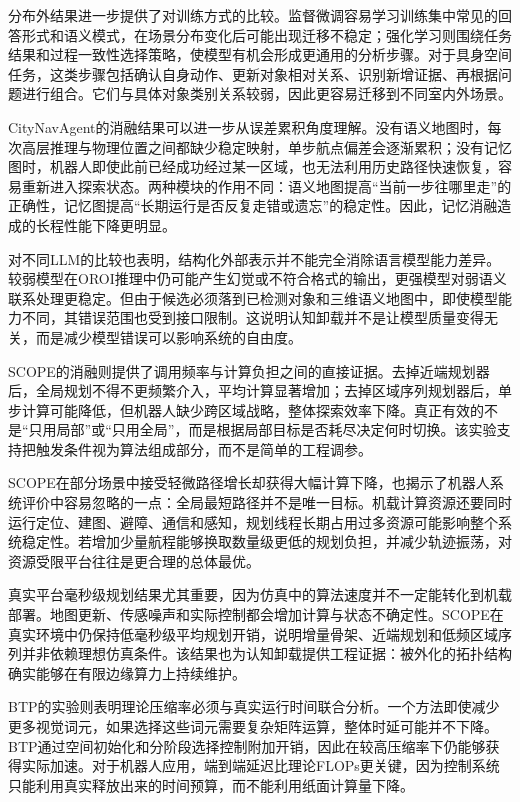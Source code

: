 分布外结果进一步提供了对训练方式的比较。监督微调容易学习训练集中常见的回答形式和语义模式，在场景分布变化后可能出现迁移不稳定；强化学习则围绕任务结果和过程一致性选择策略，使模型有机会形成更通用的分析步骤。对于具身空间任务，这类步骤包括确认自身动作、更新对象相对关系、识别新增证据、再根据问题进行组合。它们与具体对象类别关系较弱，因此更容易迁移到不同室内外场景。

CityNavAgent的消融结果可以进一步从误差累积角度理解。没有语义地图时，每次高层推理与物理位置之间都缺少稳定映射，单步航点偏差会逐渐累积；没有记忆图时，机器人即使此前已经成功经过某一区域，也无法利用历史路径快速恢复，容易重新进入探索状态。两种模块的作用不同：语义地图提高“当前一步往哪里走”的正确性，记忆图提高“长期运行是否反复走错或遗忘”的稳定性。因此，记忆消融造成的长程性能下降更明显。

对不同LLM的比较也表明，结构化外部表示并不能完全消除语言模型能力差异。较弱模型在OROI推理中仍可能产生幻觉或不符合格式的输出，更强模型对弱语义联系处理更稳定。但由于候选必须落到已检测对象和三维语义地图中，即使模型能力不同，其错误范围也受到接口限制。这说明认知卸载并不是让模型质量变得无关，而是减少模型错误可以影响系统的自由度。

SCOPE的消融则提供了调用频率与计算负担之间的直接证据。去掉近端规划器后，全局规划不得不更频繁介入，平均计算显著增加；去掉区域序列规划器后，单步计算可能降低，但机器人缺少跨区域战略，整体探索效率下降。真正有效的不是“只用局部”或“只用全局”，而是根据局部目标是否耗尽决定何时切换。该实验支持把触发条件视为算法组成部分，而不是简单的工程调参。

SCOPE在部分场景中接受轻微路径增长却获得大幅计算下降，也揭示了机器人系统评价中容易忽略的一点：全局最短路径并不是唯一目标。机载计算资源还要同时运行定位、建图、避障、通信和感知，规划线程长期占用过多资源可能影响整个系统稳定性。若增加少量航程能够换取数量级更低的规划负担，并减少轨迹振荡，对资源受限平台往往是更合理的总体最优。

真实平台毫秒级规划结果尤其重要，因为仿真中的算法速度并不一定能转化到机载部署。地图更新、传感噪声和实际控制都会增加计算与状态不确定性。SCOPE在真实环境中仍保持低毫秒级平均规划开销，说明增量骨架、近端规划和低频区域序列并非依赖理想仿真条件。该结果也为认知卸载提供工程证据：被外化的拓扑结构确实能够在有限边缘算力上持续维护。

BTP的实验则表明理论压缩率必须与真实运行时间联合分析。一个方法即使减少更多视觉词元，如果选择这些词元需要复杂矩阵运算，整体时延可能并不下降。BTP通过空间初始化和分阶段选择控制附加开销，因此在较高压缩率下仍能够获得实际加速。对于机器人应用，端到端延迟比理论FLOPs更关键，因为控制系统只能利用真实释放出来的时间预算，而不能利用纸面计算量下降。

